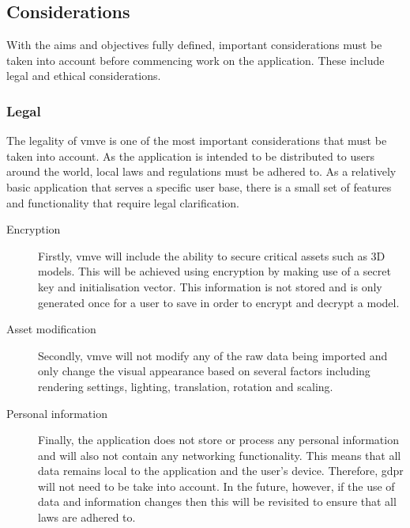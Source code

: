 \documentclass[11pt]{article}
\begin{document}


\subsection{Considerations}
With the aims and objectives fully defined, important considerations must be
taken into account before commencing work on the application. These include
legal and ethical considerations.

\subsubsection{Legal}
The legality of \gls*{vmve} is one of the most important considerations that
must be taken into account. As the application is intended to be distributed to
users around the world, local laws and regulations must be adhered to. As a
relatively basic application that serves a specific user base, there is a small
set of features and functionality that require legal clarification.

\begin{description}
  \item[Encryption]
    Firstly, \gls*{vmve} will include the ability to secure critical assets such
    as 3D models. This will be achieved using encryption by making use of a
    secret key and initialisation vector. This information is not stored and is
    only generated once for a user to save in order to encrypt and decrypt a
    model.

  \item[Asset modification] 
    Secondly, \gls*{vmve} will not modify any of the raw data being imported and
    only change the visual appearance based on several factors including
    rendering settings, lighting, translation, rotation and scaling. 

  \item[Personal information] 
    Finally, the application does not store or process any personal information
    and will also not contain any networking functionality. This means that all
    data remains local to the application and the user's device. Therefore,
    \gls*{gdpr} will not need to be take into account. In the future, however,
    if the use of data and information changes then this will be revisited to
    ensure that all laws are adhered to. 
\end{description}
\end{document}

